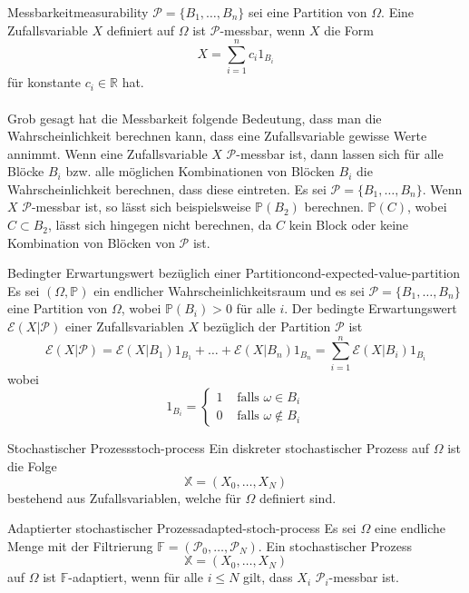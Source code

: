 \documentclass[11pt]{report} %
\begin{document}
\begin{Definition}{Messbarkeit}{measurability}
    $\mathcal{P}=\{ B_1, \ldots, B_n\}$ sei eine Partition von $\Omega$. Eine Zufallsvariable $X$ definiert auf $\Omega$ ist $\mathcal{P}$-messbar, wenn $X$ die Form $$X=\sum_{i=1}^{n}c_i1_{B_i}$$ für konstante $c_i \in \mathbb{R}$ hat.
    \\\\Grob gesagt hat die Messbarkeit folgende Bedeutung, dass man die Wahrscheinlichkeit berechnen kann, dass eine Zufallsvariable gewisse Werte annimmt. Wenn eine Zufallsvariable $X$ $\mathcal{P}$-messbar ist, dann lassen sich für alle Blöcke $B_i$ bzw. alle möglichen Kombinationen von Blöcken $B_i$ die Wahrscheinlichkeit berechnen, dass diese eintreten. Es sei $\mathcal{P}=\{ B_1, \ldots, B_n\}$. Wenn $X$ $\mathcal{P}$-messbar ist, so lässt sich beispielsweise $\mathbb{P}(B_2)$ berechnen. $\mathbb{P}(C)$, wobei $C\subset B_2$, lässt sich hingegen nicht berechnen, da $C$ kein Block oder keine Kombination von Blöcken von $\mathcal{P}$ ist.
\end{Definition}
\begin{Definition}{Bedingter Erwartungswert bezüglich einer Partition}{cond-expected-value-partition}
    Es sei $(\Omega, \mathbb{P})$ ein endlicher Wahrscheinlichkeitsraum und es sei $\mathcal{P}=\{ B_1, \ldots, B_n\}$ eine Partition von $\Omega$, wobei $\mathbb{P}(B_i)>0$ für alle $i$. Der bedingte Erwartungswert $\mathcal{E}(X|\mathcal{P})$ einer Zufallsvariablen $X$ bezüglich der Partition $\mathcal{P}$ ist 
    $$\mathcal{E}(X|\mathcal{P})=\mathcal{E}(X|B_1)1_{B_1}+\ldots+\mathcal{E}(X|B_n)1_{B_n}=\sum_{i=1}^{n}\mathcal{E}(X|B_i)1_{B_i}$$
    wobei $$1_{B_i}=\begin{cases}
        1&\text{ falls }\omega \in B_i\\
        0&\text{ falls }\omega \notin B_i
    \end{cases}$$
\end{Definition}
\begin{Definition}{Stochastischer Prozess}{stoch-process}
    Ein diskreter stochastischer Prozess auf $\Omega$ ist die Folge $$\mathbb{X}=(X_0, \ldots, X_N)$$ bestehend aus Zufallsvariablen, welche für $\Omega$ definiert sind.
\end{Definition}
\begin{Definition}{Adaptierter stochastischer Prozess}{adapted-stoch-process}
    Es sei $\Omega$ eine endliche Menge mit der Filtrierung $\mathbb{F}=(\mathcal{P}_0, \ldots, \mathcal{P}_N)$. Ein stochastischer Prozess $$\mathbb{X}=(X_0,\ldots, X_N)$$ auf $\Omega$ ist $\mathbb{F}$-adaptiert, wenn für alle $i \leq N$ gilt, dass $X_i$ $\mathcal{P}_i$-messbar ist. 
\end{Definition}
\end{document}
